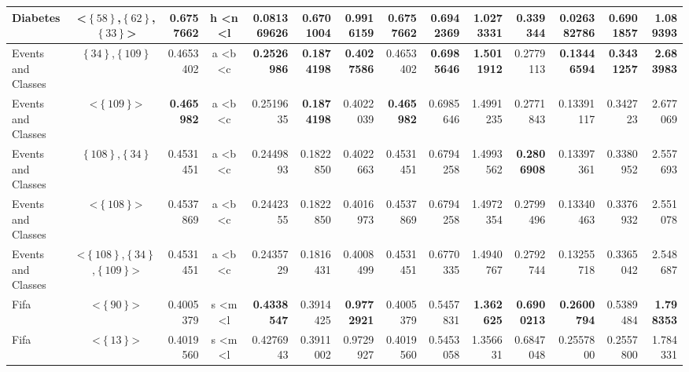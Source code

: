 \documentclass[runningheads,a4paper]{llncs}
\begin{document}
\begin{table}
\begin{tabularx}{\textwidth}{l@{}c@{}R@{}c@{}R@{}R@{}R@{}R@{}R@{}R@{}R@{}R@{}R@{}R@{}}
		\midrule
	Diabetes         & \textless$\left\{\text{58}\right\}$,$\left\{\text{62}\right\}$,$\left\{\text{33}\right\}$\textgreater & 0.6757662 & h \textless n \textless l & 0.081369626 & 0.6701004 & \textbf{0.9916159} & 0.6757662 & 0.6942369 & \textbf{1.0273331} & \textbf{0.339344} & \textbf{0.026382786} & 0.6901857 & 1.089393 \\
	    \midrule
	    \midrule
    Events and Classes   & $\left\{\text{34}\right\}$,$\left\{\text{109}\right\}$ & 0.4653402 & a \textless b \textless c & \textbf{0.2526986} & \textbf{0.1874198} & \textbf{0.4027586} & 0.4653402 & \textbf{0.6985646} & \textbf{1.5011912} & 0.2779113 & \textbf{0.13446594} & \textbf{0.3431257} & \textbf{2.683983} \\
        \midrule
    Events and Classes & \textless$\left\{\text{109}\right\}$\textgreater & \textbf{0.465982} & a \textless b \textless c & 0.2519635 & \textbf{0.1874198} & 0.4022039 & \textbf{0.465982} & 0.6985646 & 1.4991235 & 0.2771843 & 0.13391117 & 0.342723 & 2.677069 \\
        \midrule
    Events and Classes & $\left\{\text{108}\right\}$,$\left\{\text{34}\right\}$ & 0.4531451 & a \textless b \textless c & 0.2449893 & 0.1822850 & 0.4022663 & 0.4531451 & 0.6794258 & 1.4993562 & \textbf{0.2806908} & 0.13397361 & 0.3380952 & 2.557693 \\
        \midrule
    Events and Classes & \textless$\left\{\text{108}\right\}$\textgreater  & 0.4537869 & a \textless b \textless c & 0.2442355 & 0.1822850 & 0.4016973 & 0.4537869 & 0.6794258 & 1.4972354 & 0.2799496 & 0.13340463 & 0.3376932 & 2.551078 \\
        \midrule
    Events and Classes & \textless$\left\{\text{108}\right\}$,$\left\{\text{34}\right\}$,$\left\{\text{109}\right\}$\textgreater & 0.4531451 & a \textless b \textless c & 0.2435729 & 0.1816431 & 0.4008499 & 0.4531451 & 0.6770335 & 1.4940767 & 0.2792744 & 0.13255718 & 0.3365042 & 2.548687 \\
	    \midrule
	    \midrule
	Fifa & \textless$\left\{\text{90}\right\}$\textgreater & 0.4005379 & s \textless m \textless l & \textbf{0.4338547} & 0.3914425 & \textbf{0.9772921} & 0.4005379 & 0.5457831 & \textbf{1.362625} & \textbf{0.6900213} & \textbf{0.2600794} & 0.5389484 & \textbf{1.798353} \\
	    \midrule
    	Fifa & \textless$\left\{\text{13}\right\}$\textgreater & 0.4019560 & s \textless m \textless l & 0.4276943 & 0.3911002 & 0.9729927 & 0.4019560 & 0.5453058 & 1.356631 & 0.6847048 & 0.2557800 & 0.2557800 & 1.784331 \\

\end{tabularx}
\end{table}
\end{document}
